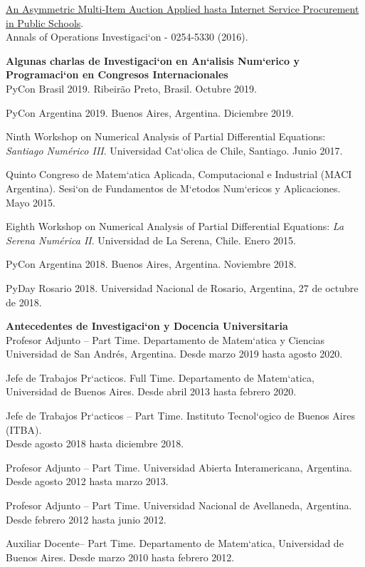 \href{https://www.dropbox.com/s/1ai0z0pcyhskpzp/JM-2016.pdf?dl=0}
{\color{blue}An Asymmetric Multi-Item Auction Applied
hasta Internet Service Procurement in Public Schools}.\\
Annals of Operations Investigaci`on - 0254-5330 (2016).

\textbf{Algunas charlas de Investigaci`on en An`alisis Num`erico y Programaci`on
en Congresos Internacionales}\\[6pt]
PyCon Brasil 2019. Ribeir\~ao Preto, Brasil. Octubre 2019.

PyCon Argentina 2019. Buenos Aires, Argentina. Diciembre 2019.

Ninth Workshop on Numerical Analysis of Partial Differential Equations: 
\emph{Santiago Num\'erico III}. Universidad Cat`olica de Chile, Santiago. Junio 2017.

Quinto Congreso de Matem`atica Aplicada, Computacional e Industrial (MACI Argentina).
Sesi`on de Fundamentos de M`etodos Num`ericos y Aplicaciones. Mayo 2015.

Eighth Workshop on Numerical Analysis of Partial Differential Equations:
\emph{La Serena Num\'erica II}. Universidad de La Serena, Chile. Enero 2015.

PyCon Argentina 2018. Buenos Aires, Argentina. Noviembre 2018.

PyDay Rosario 2018. Universidad Nacional de Rosario, Argentina, 27 de octubre
de 2018.

\textbf{Antecedentes de Investigaci`on y Docencia Universitaria}\\[6pt]
Profesor Adjunto -- Part Time. Departamento  de Matem`atica y Ciencias
Universidad de San Andr\'es, Argentina. Desde marzo 2019 hasta agosto 2020.

Jefe de Trabajos Pr`acticos. Full Time. 
Departamento  de Matem`atica, Universidad de Buenos Aires. Desde abril 2013 hasta
febrero 2020.

Jefe de Trabajos Pr`acticos -- Part Time. Instituto Tecnol`ogico de Buenos Aires (ITBA).\\
Desde agosto 2018 hasta diciembre 2018.

Profesor Adjunto -- Part Time. Universidad Abierta Interamericana, Argentina.\\
Desde agosto 2012 hasta marzo 2013.

Profesor Adjunto -- Part Time. Universidad Nacional de Avellaneda, Argentina.
Desde febrero 2012 hasta junio 2012.

Auxiliar Docente-- Part Time. Departamento  de Matem`atica,
Universidad de Buenos Aires. Desde marzo 2010 hasta febrero 2012.
